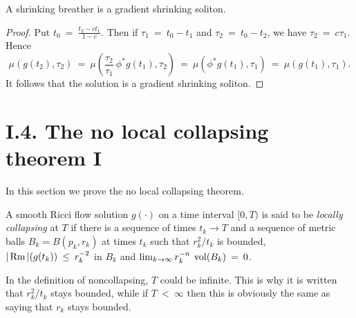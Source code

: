 \begin{proposition}
  \label{prop:kl-w-entropy-rigidity-shrinking-breathers}

A shrinking breather is a gradient shrinking soliton.
\end{proposition}
\begin{proof}
Put $t_0 \: = \: \frac{t_2 - c t_1}{1-c}$. Then if
$\tau_1 \: = \: t_0 - t_1$ and $\tau_2 \: = \: t_0 - t_2$, we
have $\tau_2 \: = \: c\tau_1$. Hence
\begin{equation}
\mu(g(t_2), \tau_2) \: = \: \mu \left( \frac{\tau_2}{\tau_1} \:
\phi^* g(t_1), \tau_2 \right) \: = \:
\mu \left(\phi^* g(t_1), \tau_1 \right)
 \: = \:
\mu \left(g(t_1), \tau_1 \right).
\end{equation}
It follows that the solution is a gradient shrinking soliton.
\end{proof}

\section{I.4. The no local collapsing theorem I}

In this section we prove the no local collapsing theorem.

\begin{definition}
  \label{def:kl-no-local-collapsing-theorem-i-locally-collapsing-definition}

A smooth Ricci flow solution $g(\cdot)$ on a time interval
$[0, T)$ is said to be {\em locally collapsing} at $T$ if there
is a sequence of times $t_k \rightarrow T$ and a sequence
of metric balls $B_k = B(p_k, r_k)$ at times $t_k$ such that
$r_k^2/t_k$ is bounded, $|\operatorname{Rm}|(g(t_k)) \: \le \: r_k^{-2}$
in $B_k$ and $\lim_{k \rightarrow \infty}
r_k^{-n} \: \operatorname{vol}(B_k) \: = \: 0$.
\end{definition}

\begin{remark}
  \label{rem:kl-no-local-collapsing-theorem-i-estimates-noncollapsing}

In the definition of noncollapsing, $T$ could be infinite.
This is why it is written that $r_k^2/t_k$ stays bounded, while
if $T \: < \: \infty$ then this is obviously the same as saying that
$r_k$ stays bounded.
\end{remark}

